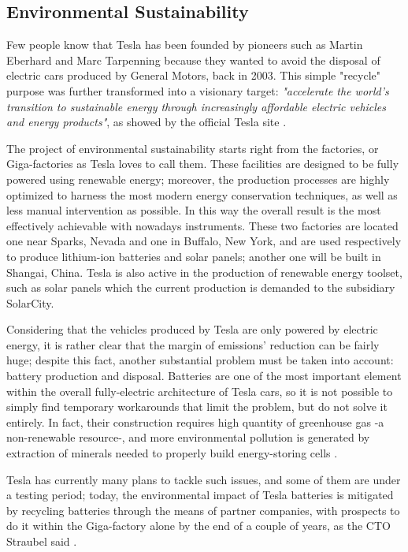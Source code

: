 \subsection{Environmental Sustainability}

Few people know that Tesla has been founded by pioneers such as Martin Eberhard and Marc Tarpenning because they wanted to avoid the disposal of electric cars produced by General Motors, back in 2003. \cite{muskGM} This simple "recycle" purpose was further transformed into a visionary target: \emph{"accelerate the world’s transition to sustainable energy through increasingly affordable electric vehicles and energy products"}, as showed by the official Tesla site \cite{aboutTesla}.

The project of environmental sustainability starts right from the factories, or Giga-factories as Tesla loves to call them. These facilities are designed to be fully powered using renewable energy; moreover, the production processes are highly optimized to harness the most modern energy conservation techniques, as well as less manual intervention as possible. In this way the overall result is the most effectively achievable with nowadays instruments. These two factories are located one near Sparks, Nevada and one in Buffalo, New York, and are used respectively to produce lithium-ion batteries and solar panels; another one will be built in Shangai, China. Tesla is also active in the production of renewable energy toolset, such as solar panels which the current production is demanded to the subsidiary SolarCity.

Considering that the vehicles produced by Tesla are only powered by electric energy, it is rather clear that the margin of emissions' reduction can be fairly huge; despite this fact, another substantial problem must be taken into account: battery production and disposal. Batteries are one of the most important element within the overall fully-electric architecture of Tesla cars, so it is not possible to simply find temporary workarounds that limit the problem, but do not solve it entirely. In fact, their construction requires high quantity of greenhouse gas -a non-renewable resource-, and more environmental pollution is generated by extraction of minerals needed to properly build energy-storing cells \cite{scheele2016cobalt}.

Tesla has currently many plans to tackle such issues, and some of them are under a testing period; today, the environmental impact of Tesla batteries is mitigated by recycling batteries through the means of partner companies, with prospects to do it within the Giga-factory alone by the end of a couple of years, as the CTO Straubel said \cite{recycleBattery}.

